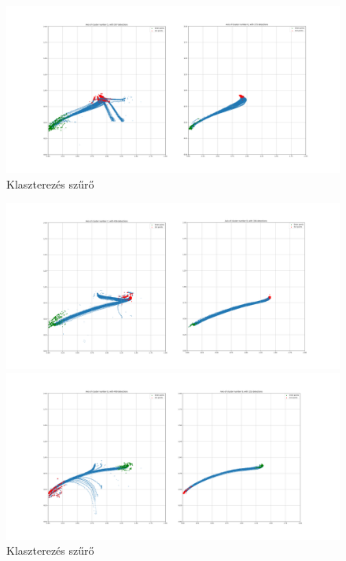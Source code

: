 \documentclass[acmtog, authorversion]{acmart}
\begin{document}
\begin{figure}
 \includegraphics[width=1\columnwidth]{clustering/n_cluster_5_before_after.png}

 \caption{Klaszterezés szűrő}

 \label{fig: Klaszterezés szűrő}   
\end{figure}

\begin{figure}
 \includegraphics[width=1\columnwidth]{clustering/n_cluster_7_before_after.png}

 \includegraphics[width=1\columnwidth]{clustering/n_cluster_8_before_after.png}

 \caption{Klaszterezés szűrő }

 \label{fig: Klaszterezés szűrő 2}   
\end{figure}
\end{document}
